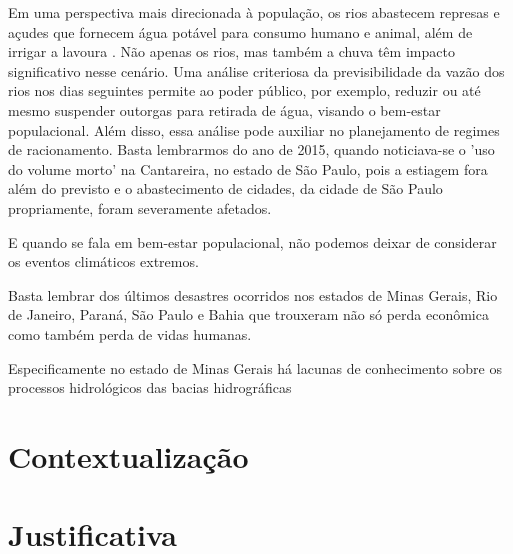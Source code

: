 Em uma perspectiva mais direcionada à população, os rios abastecem represas e açudes que fornecem água potável para consumo humano e animal, além de irrigar a lavoura . Não apenas os rios, mas também a chuva têm impacto significativo nesse cenário. Uma análise criteriosa da previsibilidade da vazão dos rios nos dias seguintes permite ao poder público, por exemplo, reduzir ou até mesmo suspender outorgas para retirada de água, visando o bem-estar populacional. Além disso, essa análise pode auxiliar no planejamento de regimes de racionamento. Basta lembrarmos do ano de 2015, quando noticiava-se o 'uso do volume morto'  na Cantareira, no estado de São Paulo, pois a estiagem fora além do previsto e o abastecimento de cidades, da cidade de São Paulo propriamente, foram severamente afetados.\cite{g1_cantareira_2015}

E quando se fala em bem-estar populacional, não podemos deixar de considerar os eventos climáticos extremos. 


Basta lembrar dos últimos desastres ocorridos nos estados de Minas Gerais, Rio de Janeiro, Paraná, São Paulo e Bahia que trouxeram não só perda econômica como também perda de vidas humanas. \cite{bbc_chuvas_bahia_2024} \cite{cnn_temporais_mg_2024} \cite{g1_temporal_es_2024} \cite{g1_temporal_petropolis_2022}

Especificamente no estado de Minas Gerais há lacunas de conhecimento sobre os processos hidrológicos das bacias hidrográficas

\section{Contextualização}

\section{Justificativa}

